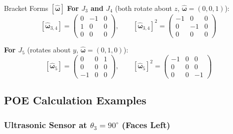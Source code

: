 \documentclass[12pt,a4paper]{article}
\newcommand{\vect}[1]{\bm{#1}}
\begin{document}
\begin{mathbox}{Bracket Forms $[\vect{\hat\omega}]$}
\textbf{For $J_3$ and $J_4$} (both rotate about $z$, $\vect{\hat\omega} = (0,0,1)$):
\[
  [\vect{\hat\omega}_{3,4}]
  = \begin{pmatrix}0&-1&0\\1&0&0\\0&0&0\end{pmatrix},
  \qquad
  [\vect{\hat\omega}_{3,4}]^2
  = \begin{pmatrix}-1&0&0\\0&-1&0\\0&0&0\end{pmatrix}
\]

\textbf{For $J_5$} (rotates about $y$, $\vect{\hat\omega} = (0,1,0)$):
\[
  [\vect{\hat\omega}_5]
  = \begin{pmatrix}0&0&1\\0&0&0\\-1&0&0\end{pmatrix},
  \qquad
  [\vect{\hat\omega}_5]^2
  = \begin{pmatrix}-1&0&0\\0&0&0\\0&0&-1\end{pmatrix}
\]
\end{mathbox}

\subsection{POE Calculation Examples}

\subsubsection{Ultrasonic Sensor at $\theta_3 = 90^\circ$ (Faces Left)}
\end{document}
